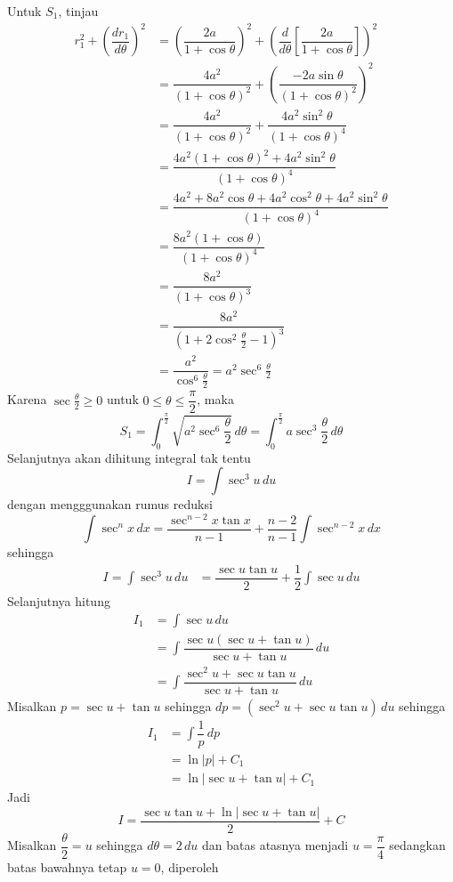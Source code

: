 \documentclass{article}
\begin{document}
\begin{enumerate}
	Untuk $S_1$, tinjau
	\begin{align*}
	r_1^2+\left(\dfrac{dr_1}{d\theta}\right)^2 &= \left(\dfrac{2a}{1+\cos\theta}\right)^2 + \left(\dfrac{d}{d\theta}\left[\dfrac{2a}{1+\cos\theta}\right]\right)^2\\
	&= \dfrac{4a^2}{(1+\cos\theta)^2} + \left(\dfrac{-2a\sin\theta}{(1+\cos\theta)^2}\right)^2\\
	&= \dfrac{4a^2}{(1+\cos\theta)^2} + \dfrac{4a^2\sin^2\theta}{(1+\cos\theta)^4}\\
	&= \dfrac{4a^2(1+\cos\theta)^2+4a^2\sin^2\theta}{(1+\cos\theta)^4}\\
	&= \dfrac{4a^2+8a^2\cos\theta+4a^2\cos^2\theta+4a^2\sin^2\theta}{(1+\cos\theta)^4}\\
	&= \dfrac{8a^2(1+\cos\theta)}{(1+\cos\theta)^4}\\
	&= \dfrac{8a^2}{(1+\cos\theta)^3}\\
	&= \dfrac{8a^2}{(1+2\cos^2\frac{\theta}{2}-1)^3}\\
	&= \dfrac{a^2}{\cos^6\frac{\theta}{2}} = a^2\sec^6\frac{\theta}{2}
\end{align*}	 
Karena $\sec\frac{\theta}{2}\geq 0$ untuk $0\leq \theta\leq \dfrac{\pi}{2}$, maka 
$$ S_1 = \int_0^\frac{\pi}{2} \sqrt{a^2\sec^6\frac{\theta}{2}}\, d\theta =\int_0^\frac{\pi}{2} a\sec^3\frac{\theta}{2}\, d\theta$$
Selanjutnya akan dihitung integral tak tentu 
$$ I = \int \sec^3 u \, du $$
dengan mengggunakan rumus reduksi
$$ \int \sec^n x\, dx = \dfrac{\sec^{n-2}x\tan x}{n-1}+\dfrac{n-2}{n-1}\int \sec^{n-2} x\, dx $$ 
sehingga
\begin{align*}
 I = \int\sec^3 u\, du &= \dfrac{\sec u\tan u}{2}+\dfrac{1}{2}\int \sec u\, du
\end{align*}
Selanjutnya hitung
\begin{align*}
I_1 &= \int\sec u\, du\\
&= \int \dfrac{\sec u(\sec u+\tan u)}{\sec u+\tan u}\, du\\
&= \int\dfrac{\sec^2 u+\sec u\tan u}{\sec u+\tan u}\, du
\end{align*}
Misalkan $p=\sec u+\tan u$ sehingga $dp = (\sec^2 u +\sec u\tan u) \, du$ sehingga
\begin{align*}
I_1 &= \int \dfrac{1}{p}\, dp\\
&= \ln |p| + C_1\\
&= \ln |\sec u +\tan u| + C_1
\end{align*}
Jadi 
$$ I = \dfrac{\sec u\tan u+\ln |\sec u+\tan u|}{2}+C $$
Misalkan $\dfrac{\theta}{2}=u$ sehingga $d\theta=2\, du$ dan batas atasnya menjadi $u=\dfrac{\pi}{4}$ sedangkan batas bawahnya tetap $u=0$, diperoleh

\end{enumerate}
\end{document}
